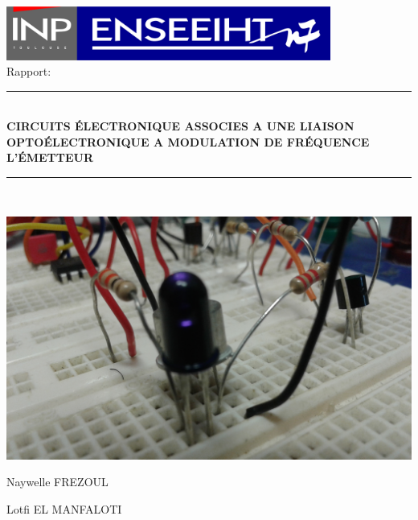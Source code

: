 \documentclass[a4paper]{report}
\begin{document}
\\[0.5cm]\center \includegraphics[width=0.8\textwidth]{inpn7logo.pdf}\\[2cm]



{\Large Rapport:}\\[0.5cm]

\rule{\linewidth}{0.5mm} \\[0.4cm]
{ \huge \bfseries CIRCUITS ÉLECTRONIQUE ASSOCIES A UNE LIAISON OPTOÉLECTRONIQUE A MODULATION DE FRÉQUENCE\\[0.4cm] }
{ \large \bfseries L'ÉMETTEUR\\[0.4cm] }
\rule{\linewidth}{0.5mm} \\[1cm]

\begin{center}
\includegraphics[width=1\textwidth]{led.jpg}
\end{center}


\noindent
\center
\begin{minipage}{0.4\textwidth}
  \begin{flushleft} \large   
    Naywelle \textsc{FREZOUL} 
  \end{flushleft}
\end{minipage}
\begin{minipage}{0.4\textwidth}
  \begin{flushright} \large
    Lotfi \textsc{EL MANFALOTI} 
  \end{flushright}
\end{minipage}
\end{document}
